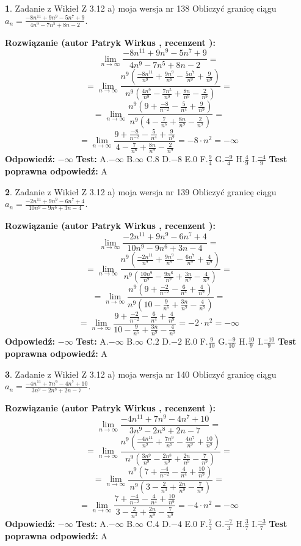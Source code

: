 \documentclass[12pt, a4paper]{article}
\theoremstyle{definition} %
\newtheorem{zad}{}
\newcommand{\zadStart}[1]{\begin{zad}#1\newline}
\newcommand{\zadStop}{\end{zad}}
\newcommand{\rozwStart}[2]{\noindent \textbf{Rozwiązanie (autor #1 , recenzent #2): }\newline}
\newcommand{\rozwStop}{\newline}
\newcommand{\odpStart}{\noindent \textbf{Odpowiedź:}\newline}
\newcommand{\odpStop}{\newline}
\newcommand{\testStart}{\noindent \textbf{Test:}\newline}
\newcommand{\testStop}{\newline}
\newcommand{\kluczStart}{\noindent \textbf{Test poprawna odpowiedź:}\newline}
\newcommand{\kluczStop}{\newline}
\begin{document}
\zadStart{Zadanie z Wikieł Z 3.12 a) moja wersja nr 138}
Obliczyć granicę ciągu $a_{n}=\frac{-8n^{11}+9n^{9}-5n^{7}+9}{4n^{9}-7n^{5}+8n-2}$.
\zadStop
\rozwStart{Patryk Wirkus}{}
$$\lim\limits_{n\to\infty}\frac{-8n^{11}+9n^{9}-5n^{7}+9}{4n^{9}-7n^{5}+8n-2}=$$
$$=\lim\limits_{n\to\infty}\frac{n^{9}\left(\frac{-8n^{11}}{n^{9}}+\frac{9n^{9}}{n^{9}}-\frac{5n^{7}}{n^{9}}+\frac{9}{n^{9}}\right)}{n^{9}\left(\frac{4n^{9}}{n^{9}}-\frac{7n^{5}}{n^{9}}+\frac{8n}{n^{9}}-\frac{2}{n^{9}}\right)}=$$
$$=\lim\limits_{n\to\infty}\frac{n^{9}\left(9+\frac{-8}{n^{-2}}-\frac{5}{n^{4}}+\frac{9}{n^{9}}\right)}
{n^{9}\left(4-\frac{7}{n^{6}}+\frac{8n}{n^{9}}-\frac{2}{n^{9}}\right)}=$$
$$=\lim\limits_{n\to\infty}\frac{9+\frac{-8}{n^{-2}}-\frac{5}{n^{4}}+\frac{9}{n^{9}}}{4-\frac{7}{n^{6}}+\frac{8n}{n^{9}}-\frac{2}{n^{9}}}=-8\cdot n^{2} = -\infty$$
\rozwStop
\odpStart
$-\infty$
\odpStop
\testStart
A.$-\infty$
B.$\infty$
C.$8$
D.$-8$
E.$0$
F.$\frac{9}{4}$
G.$\frac{-9}{4}$
H.$\frac{4}{9}$
I.$\frac{-4}{9}$
\testStop
\kluczStart
A
\kluczStop



\zadStart{Zadanie z Wikieł Z 3.12 a) moja wersja nr 139}
Obliczyć granicę ciągu $a_{n}=\frac{-2n^{11}+9n^{9}-6n^{7}+4}{10n^{9}-9n^{6}+3n-4}$.
\zadStop
\rozwStart{Patryk Wirkus}{}
$$\lim\limits_{n\to\infty}\frac{-2n^{11}+9n^{9}-6n^{7}+4}{10n^{9}-9n^{6}+3n-4}=$$
$$=\lim\limits_{n\to\infty}\frac{n^{9}\left(\frac{-2n^{11}}{n^{9}}+\frac{9n^{9}}{n^{9}}-\frac{6n^{7}}{n^{9}}+\frac{4}{n^{9}}\right)}{n^{9}\left(\frac{10n^{9}}{n^{9}}-\frac{9n^{6}}{n^{9}}+\frac{3n}{n^{9}}-\frac{4}{n^{9}}\right)}=$$
$$=\lim\limits_{n\to\infty}\frac{n^{9}\left(9+\frac{-2}{n^{-2}}-\frac{6}{n^{4}}+\frac{4}{n^{9}}\right)}
{n^{9}\left(10-\frac{9}{n^{5}}+\frac{3n}{n^{9}}-\frac{4}{n^{9}}\right)}=$$
$$=\lim\limits_{n\to\infty}\frac{9+\frac{-2}{n^{-2}}-\frac{6}{n^{4}}+\frac{4}{n^{9}}}{10-\frac{9}{n^{5}}+\frac{3n}{n^{9}}-\frac{4}{n^{9}}}=-2\cdot n^{2} = -\infty$$
\rozwStop
\odpStart
$-\infty$
\odpStop
\testStart
A.$-\infty$
B.$\infty$
C.$2$
D.$-2$
E.$0$
F.$\frac{9}{10}$
G.$\frac{-9}{10}$
H.$\frac{10}{9}$
I.$\frac{-10}{9}$
\testStop
\kluczStart
A
\kluczStop



\zadStart{Zadanie z Wikieł Z 3.12 a) moja wersja nr 140}
Obliczyć granicę ciągu $a_{n}=\frac{-4n^{11}+7n^{9}-4n^{7}+10}{3n^{9}-2n^{8}+2n-7}$.
\zadStop
\rozwStart{Patryk Wirkus}{}
$$\lim\limits_{n\to\infty}\frac{-4n^{11}+7n^{9}-4n^{7}+10}{3n^{9}-2n^{8}+2n-7}=$$
$$=\lim\limits_{n\to\infty}\frac{n^{9}\left(\frac{-4n^{11}}{n^{9}}+\frac{7n^{9}}{n^{9}}-\frac{4n^{7}}{n^{9}}+\frac{10}{n^{9}}\right)}{n^{9}\left(\frac{3n^{9}}{n^{9}}-\frac{2n^{8}}{n^{9}}+\frac{2n}{n^{9}}-\frac{7}{n^{9}}\right)}=$$
$$=\lim\limits_{n\to\infty}\frac{n^{9}\left(7+\frac{-4}{n^{-2}}-\frac{4}{n^{4}}+\frac{10}{n^{9}}\right)}
{n^{9}\left(3-\frac{2}{n^{3}}+\frac{2n}{n^{9}}-\frac{7}{n^{9}}\right)}=$$
$$=\lim\limits_{n\to\infty}\frac{7+\frac{-4}{n^{-2}}-\frac{4}{n^{4}}+\frac{10}{n^{9}}}{3-\frac{2}{n^{3}}+\frac{2n}{n^{9}}-\frac{7}{n^{9}}}=-4\cdot n^{2} = -\infty$$
\rozwStop
\odpStart
$-\infty$
\odpStop
\testStart
A.$-\infty$
B.$\infty$
C.$4$
D.$-4$
E.$0$
F.$\frac{7}{3}$
G.$\frac{-7}{3}$
H.$\frac{3}{7}$
I.$\frac{-3}{7}$
\testStop
\kluczStart
A
\kluczStop
\end{document}
